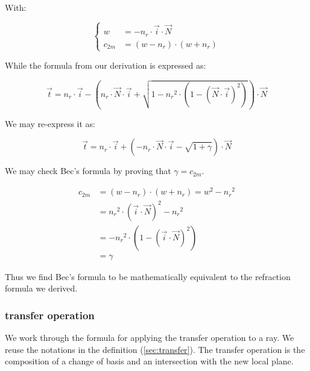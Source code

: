 With:

\begin{equation} \begin{cases}
w &= - n_r \cdot \overrightarrow{i} \cdot \overrightarrow{N} \\
c_{2m} &= (w - n_r) \cdot (w + n_r)
\end{cases} \end{equation}

While the formula from our derivation is expressed as:

\begin{equation}
\overrightarrow{t} = n_r \cdot \overrightarrow{i} -
\left(n_r \cdot \overrightarrow{N} \cdot \overrightarrow{i}
+ \sqrt{1 - {n_r}^2 \cdot \left(1 - 
             \left(\overrightarrow{N} \cdot \overrightarrow{i}\right)^2\right)}
\right)
\cdot \overrightarrow{N}
\end{equation}

We may re-express it as:

\begin{equation}
\overrightarrow{t} = n_r \cdot \overrightarrow{i} +
\left(- n_r \cdot \overrightarrow{N} \cdot \overrightarrow{i}
- \sqrt{1 + \gamma} \right) \cdot \overrightarrow{N}
\end{equation}

We may check Bec's formula by proving that $\gamma = c_{2m}$.

\begin{equation} \begin{split}
c_{2m} &= (w - n_r) \cdot (w + n_r) = w^2 - {n_r}^2 \\
       &= {n_r}^2 \cdot
          \left( \overrightarrow{i} \cdot \overrightarrow{N} \right)^2
          - {n_r}^2 \\
       &= -{n_r}^2 \cdot
           \left(1 - \left(\overrightarrow{i} \cdot
                     \overrightarrow{N}\right)^2\right) \\
       &= \gamma
\end{split} \end{equation}

Thus we find Bec's formula to be mathematically equivalent to the refraction
formula we derived.

\subsubsection{transfer operation}
We work through the formula for applying the transfer operation to a ray.
We reuse the notations in the definition (\cref{sec:transfer}). The transfer
operation is the composition of a change of basis and an intersection with
the new local plane.

